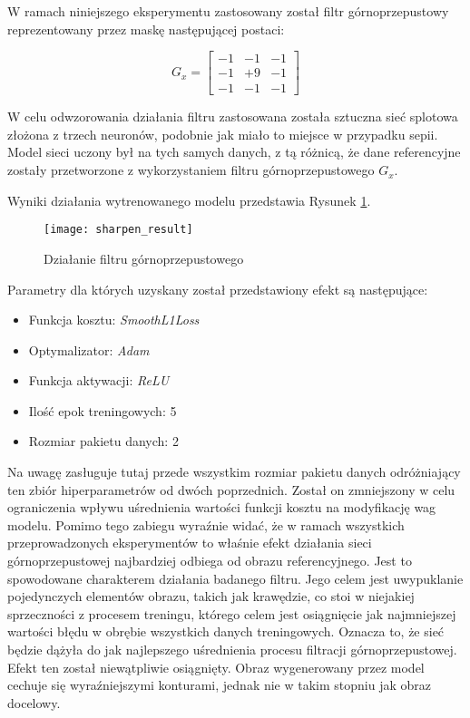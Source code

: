     W ramach niniejszego eksperymentu zastosowany został filtr górnoprzepustowy
    reprezentowany przez maskę następującej postaci:

    \[G_x =
    \begin{bmatrix}
    -1 & -1 & -1 \\
    -1 & +9 & -1 \\
    -1 & -1 & -1
    \end{bmatrix}
    \]

    W celu odwzorowania działania filtru zastosowana została sztuczna sieć
    splotowa złożona z trzech neuronów, podobnie jak miało to miejsce w przypadku
    sepii. Model sieci uczony był na tych samych danych, z tą różnicą, że dane
    referencyjne zostały przetworzone z wykorzystaniem filtru górnoprzepustowego
    $G_x$.

    Wyniki działania wytrenowanego modelu przedstawia Rysunek \ref{fig:sharpen_result}.

    \begin{figure}[H]
      \centering
      \texttt{[image: sharpen\_result]}
      \caption[Działanie filtru górnoprzepustowego - źródło: Praca własna]{Działanie filtru górnoprzepustowego}
      \label{fig:sharpen_result}
    \end{figure}

    Parametry dla których uzyskany został przedstawiony efekt są następujące:

    \begin{itemize}
    \item Funkcja kosztu: \textit{SmoothL1Loss}
    \item Optymalizator: \textit{Adam}
    \item Funkcja aktywacji: \textit{ReLU}
    \item Ilość epok treningowych: 5
    \item Rozmiar pakietu danych: 2
    \end{itemize}

    Na uwagę zasługuje tutaj przede wszystkim rozmiar pakietu danych odróżniający
    ten zbiór hiperparametrów od dwóch poprzednich. Został on zmniejszony w celu
    ograniczenia wpływu uśrednienia wartości funkcji kosztu na modyfikację wag
    modelu. Pomimo tego zabiegu wyraźnie widać, że w ramach wszystkich przeprowadzonych
    eksperymentów to właśnie efekt działania sieci górnoprzepustowej najbardziej
    odbiega od obrazu referencyjnego. Jest to spowodowane charakterem działania
    badanego filtru. Jego celem jest uwypuklanie pojedynczych elementów obrazu, takich
    jak krawędzie, co stoi w niejakiej sprzeczności z procesem treningu, którego celem
    jest osiągnięcie jak najmniejszej wartości błędu w obrębie wszystkich danych
    treningowych. Oznacza to, że sieć będzie dążyła do jak najlepszego uśrednienia
    procesu filtracji górnoprzepustowej. Efekt ten został niewątpliwie osiągnięty.
    Obraz wygenerowany przez model cechuje się wyraźniejszymi konturami, jednak
    nie w takim stopniu jak obraz docelowy.

